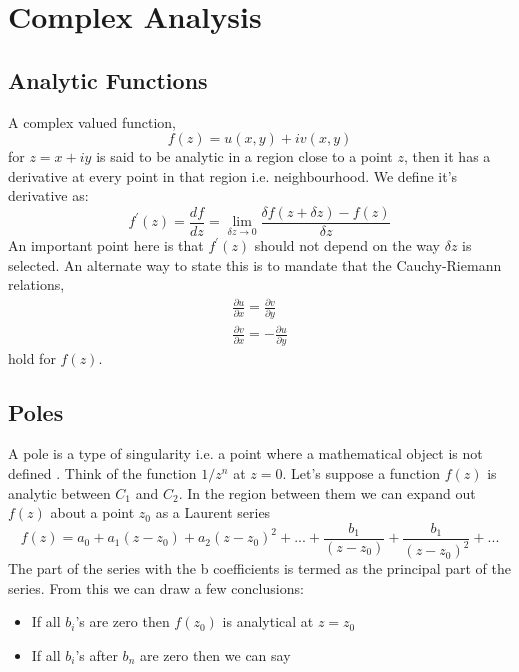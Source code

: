 \section{Complex Analysis}
\label{appendix_c}
\subsection{Analytic Functions}
A complex valued function, 
\begin{equation}
    f(z) = u(x,y) + iv(x,y)
\end{equation}
for $z = x + iy$ is said to be analytic in a region close to a point $z$, then it has a derivative at every point in that region i.e. neighbourhood. We define it's derivative as:
\begin{equation}
   f^{'}(z)  = \frac{df}{dz} = \lim_{\delta z  \rightarrow 0}\frac{\delta f(z + \delta z) - f(z)}{\delta z}
\end{equation}
An important point here is that $f^{'}(z)$ should not depend on the way $\delta z$ is selected. An alternate way to state this is to mandate that the Cauchy-Riemann relations,
\begin{equation}
    \begin{aligned}
    \frac{\partial u}{\partial x} = \frac{\partial v}{\partial y} \\
    \frac{\partial v}{\partial x} = - \frac{\partial u}{\partial y}
    \end{aligned}
\end{equation}
hold for $f(z)$.
\subsection{Poles}
A pole is a type of singularity i.e. a point where a mathematical object is not defined
. Think of the function $1/ z^{n}$ at $z = 0$. Let's suppose a function $f(z)$ is analytic between $C_{1}$ and $C_{2}$. In the region between them we can expand out $f(z)$ about a point $z_{0}$ as a Laurent series
\begin{equation}
    f(z) = a_{0} + a_{1} {(z- z_{0})} + a_{2} {(z- z_{0})}^{2} + ... + \frac{b_{1}}{{(z- z_{0})}} + \frac{b_{1}}{{(z- z_{0})}^{2}} + ...
\end{equation}
The part of the series with the b coefficients is termed as the principal part of the series. From this we can draw a few conclusions:
\begin{itemize}
    \item If all $b_{i}$'s are zero then $f(z_{0})$ is analytical at $z = z_{0}$
    \item If all $b_{i}$'s after $b_{n}$ are zero then we can say 
\end{itemize}
